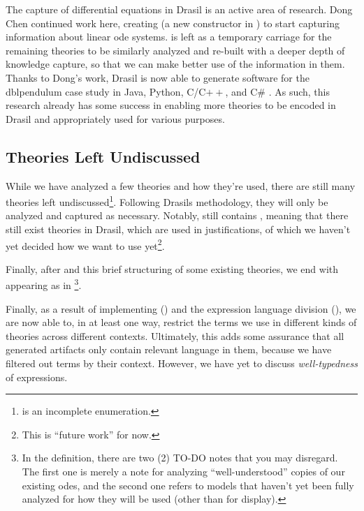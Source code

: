 The capture of differential equations in Drasil is an active area of research.
Dong Chen continued work here, creating \NewDEModel{} \cite{Chen2022MEng} (a new
constructor in \ModelKinds{}) to start capturing information about linear
\acs{ode} systems. \DEModel{} is left as a temporary carriage for the remaining
theories to be similarly analyzed and re-built with a deeper depth of knowledge
capture, so that we can make better use of the information in them. Thanks to
Dong's work, Drasil is now able to generate software for the \acs{dblpendulum}
case study in Java, Python, C/C$++$, and C\# \cite{Chen2022MEng}. As such, this
research already has some success in enabling more theories to be encoded in
Drasil and appropriately used for various purposes.

\subsection{Theories Left Undiscussed}
\label{chap:more-theory-kinds:sec:classify-all-the-theories:subsec:theories-left-undiscussed}

While we have analyzed a few theories and how they're used, there are still many
theories left undiscussed\footnote{\ModelKinds{} is an incomplete enumeration.}.
Following Drasils methodology, they will only be analyzed and captured as
necessary. Notably, \ModelKinds{} still contains \OthModel{}, meaning that there
still exist theories in Drasil, which are used in justifications, of which we
haven't yet decided how we want to use yet\footnote{This is ``future work'' for
now.}.

Finally, after  and this brief structuring of some
existing theories, we end with \ModelKinds{} appearing as in
\footnote{In the 
definition, there are two (2) TO-DO notes that you may disregard. The first one
is merely a note for analyzing ``well-understood'' copies of our existing
\acsp{ode}, and the second one refers to models that haven't yet been fully
analyzed for how they will be used (other than for display).}.

\currentModelKindsHaskell{}

Finally, as a result of implementing \ModelKinds{} () and
the expression language division (), we are now able
to, in at least one way, restrict the terms we use in different kinds of
theories across different contexts. Ultimately, this adds some assurance that
all generated artifacts only contain relevant language in them, because we have
filtered out terms by their context. However, we have yet to discuss
\textit{well-typedness} of expressions.
